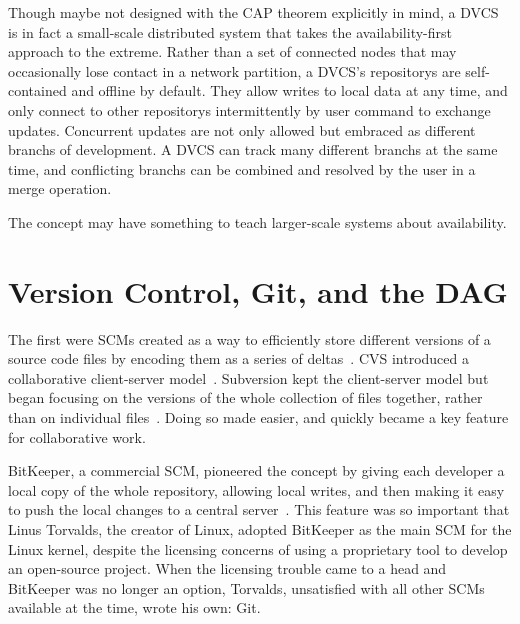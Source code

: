 Though maybe not designed with the CAP theorem explicitly in mind, a \gls{DVCS}
is in fact a small-scale distributed system that takes the availability-first
approach to the extreme. Rather than a set of connected nodes that may
occasionally lose contact in a network partition, a \gls{DVCS}'s
\glspl{repository} are self-contained and offline by default. They allow writes
to local data at any time, and only connect to other \glspl{repository}
intermittently by user command to exchange updates. Concurrent updates are not
only allowed but embraced as different \glspl{branch} of development. A
\gls{DVCS} can track many different \glspl{branch} at the same time, and
conflicting \glspl{branch} can be combined and resolved by the user in a
\gls{merge} operation.

The  concept may have something to
teach larger-scale systems about availability.

%



\section{Version Control, Git, and the DAG}

The first  were \glspl{SCM} created as a way to efficiently store
different versions of a source code files by encoding them as a series of
deltas~\cite{history_of_version_control}. CVS introduced a collaborative
client-server model~\cite{history_of_version_control,cvs_book}. Subversion kept
the client-server model but began focusing on the versions of the whole
collection of files together, rather than on individual
files~\cite{history_of_version_control,svnbook}. Doing so made
 easier, and  quickly
became a key feature for collaborative work.

BitKeeper, a commercial \gls{SCM}, pioneered the  concept by giving each developer a local copy of the whole
\gls{repository}, allowing local writes, and then making it easy to push the
local changes to a central
server~\cite{history_of_version_control,git_10_years_interview}. This feature
was so important that Linus Torvalds, the creator of Linux, adopted BitKeeper as
the main \acrlong{SCM} for the Linux kernel, despite the licensing concerns of
using a proprietary tool to develop an open-source project. When the
licensing trouble came to a head and BitKeeper was no longer an option,
Torvalds, unsatisfied with all other \glspl{SCM} available at the time, wrote
his own: Git.~\cite{history_of_version_control,git_10_years_interview}

